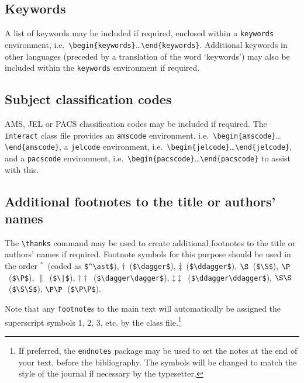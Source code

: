 \documentclass[]{interact}
\theoremstyle{plain}%
\theoremstyle{definition}
\theoremstyle{remark}
\begin{document}
\subsection{Keywords}

A list of keywords may be included if required, enclosed within a \texttt{keywords} environment, i.e.\ \verb"\begin{keywords}"\ldots\verb"\end{keywords}". Additional keywords in other languages (preceded by a translation of the word `keywords') may also be included within the \verb"keywords" environment if required.


\subsection{Subject classification codes}

AMS, JEL or PACS classification codes may be included if required. The \texttt{interact} class file provides an \texttt{amscode} environment, i.e.\ \verb"\begin{amscode}"\ldots\verb"\end{amscode}", a \texttt{jelcode} environment, i.e.\ \verb"\begin{jelcode}"\ldots\verb"\end{jelcode}", and a \texttt{pacscode} environment, i.e.\ \verb"\begin{pacscode}"\ldots\verb"\end{pacscode}" to assist with this.


\subsection{Additional footnotes to the title or authors' names}

The \verb"\thanks" command may be used to create additional footnotes to the title or authors' names if required. Footnote symbols for this purpose should be used in the order
$^\ast$~(coded as \verb"$^\ast$"), $\dagger$~(\verb"$\dagger$"), $\ddagger$~(\verb"$\ddagger$"), $\S$~(\verb"$\S$"), $\P$~(\verb"$\P$"), $\|$~(\verb"$\|$"),
$\dagger\dagger$~(\verb"$\dagger\dagger$"), $\ddagger\ddagger$~(\verb"$\ddagger\ddagger$"), $\S\S$~(\verb"$\S\S$"), $\P\P$~(\verb"$\P\P$").

Note that any \verb"footnote"s to the main text will automatically be assigned the superscript symbols 1, 2, 3, etc. by the class file.\footnote{If preferred, the \texttt{endnotes} package may be used to set the notes at the end of your text, before the bibliography. The symbols will be changed to match the style of the journal if necessary by the typesetter.}
\end{document}

